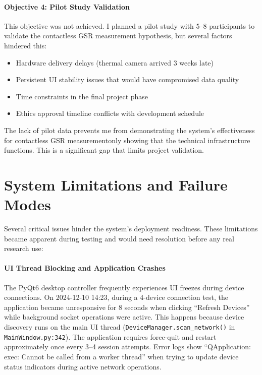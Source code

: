 \paragraph{\textbf{Objective 4: Pilot Study Validation}} This objective was not achieved. I planned a pilot study with 5--8 participants to validate the contactless GSR measurement hypothesis, but several factors hindered this:
\begin{itemize}
    \item Hardware delivery delays (thermal camera arrived 3 weeks late)
    \item Persistent UI stability issues that would have compromised data quality
    \item Time constraints in the final project phase
    \item Ethics approval timeline conflicts with development schedule
\end{itemize}
The lack of pilot data prevents me from demonstrating the system's effectiveness for contactless GSR measurement\textemdash only showing that the technical infrastructure functions. This is a significant gap that limits project validation.


\section{System Limitations and Failure Modes}

Several critical issues hinder the system's deployment readiness. These limitations became apparent during testing and would need resolution before any real research use:

\paragraph{\textbf{UI Thread Blocking and Application Crashes}} The PyQt6 desktop controller frequently experiences UI freezes during device connections. On 2024-12-10 14:23, during a 4-device connection test, the application became unresponsive for 8 seconds when clicking ``Refresh Devices'' while background socket operations were active. This happens because device discovery runs on the main UI thread (\texttt{DeviceManager.scan\_network()} in \texttt{MainWindow.py:342}). The application requires force-quit and restart approximately once every 3--4 session attempts. Error logs show ``QApplication: exec: Cannot be called from a worker thread'' when trying to update device status indicators during active network operations.

